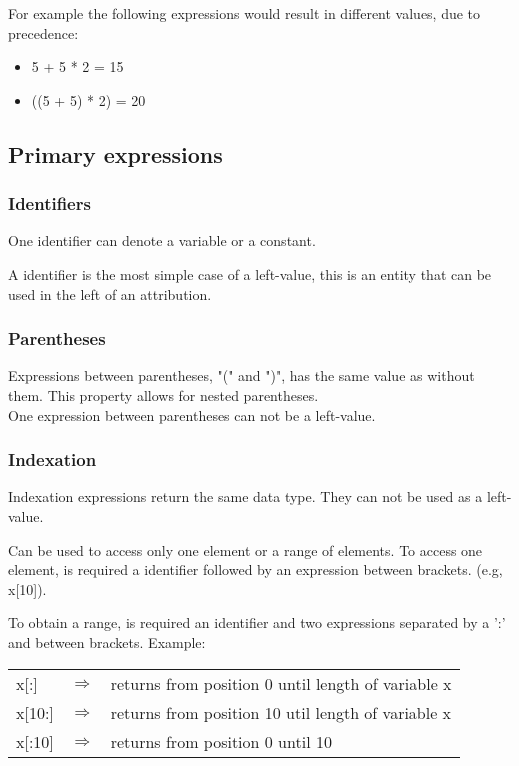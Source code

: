 \documentclass{article}
\begin{document}
For example the following expressions would result in different values, due to precedence: 

\begin{itemize}
\item 5 + 5 * 2 = 15 
\item ((5 + 5) * 2) = 20
\end{itemize}

\subsection{Primary expressions}

\subsubsection{Identifiers}

One identifier can denote a variable or a constant.

A identifier is the most simple case of a left-value, this is an entity that can be used in the left of an attribution.

\subsubsection{Parentheses}

Expressions between parentheses, "(" and ")", has the same value as without them. This property allows for nested parentheses. \\

\noindent
One expression between parentheses can not be a left-value.

\subsubsection{Indexation}

Indexation expressions return the same data type. They can not be used as a left-value.

Can be used to access only one element or a range of elements. To access one element, is required a identifier followed by an expression between brackets. (e.g, x[10]).

To obtain a range, is required an identifier and two expressions separated by a ':' and between brackets. Example: \\

\begin{table}[H]
\center
    \begin{tabular}{lll}
    x[:] & $\Longrightarrow$ & returns from position 0 until length of variable x \\
    x[10:] & $\Longrightarrow$ & returns from position 10 util length of variable x \\
    x[:10] & $\Longrightarrow$ & returns from position 0 until 10 \\
    \end{tabular}
\end{table}
\end{document}
